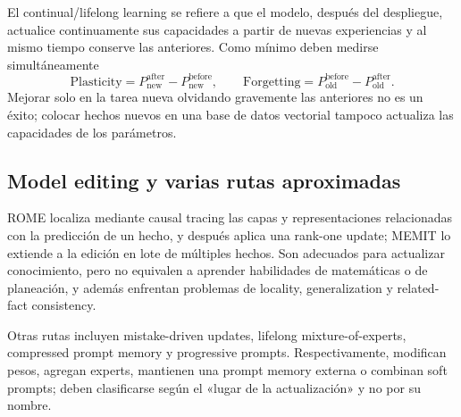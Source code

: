 El continual/lifelong learning se refiere a que el modelo, después del despliegue, actualice continuamente sus capacidades a partir de nuevas experiencias y al mismo tiempo conserve las anteriores. Como mínimo deben medirse simultáneamente
\[
\text{Plasticity}=P_{\text{new}}^{\text{after}}-P_{\text{new}}^{\text{before}},\qquad
\text{Forgetting}=P_{\text{old}}^{\text{before}}-P_{\text{old}}^{\text{after}}.
\]
Mejorar solo en la tarea nueva olvidando gravemente las anteriores no es un éxito; colocar hechos nuevos en una base de datos vectorial tampoco actualiza las capacidades de los parámetros.






\subsection{Model editing y varias rutas aproximadas}

ROME localiza mediante causal tracing las capas y representaciones relacionadas con la predicción de un hecho, y después aplica una rank-one update; MEMIT lo extiende a la edición en lote de múltiples hechos. Son adecuados para actualizar conocimiento, pero no equivalen a aprender habilidades de matemáticas o de planeación, y además enfrentan problemas de locality, generalization y related-fact consistency.



Otras rutas incluyen mistake-driven updates, lifelong mixture-of-experts, compressed prompt memory y progressive prompts. Respectivamente, modifican pesos, agregan experts, mantienen una prompt memory externa o combinan soft prompts; deben clasificarse según el «lugar de la actualización» y no por su nombre.


